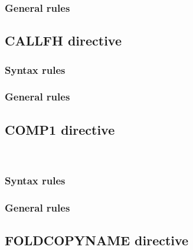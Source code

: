 \subsubsection{General rules}

\subsection{CALLFH directive}

\begin{syntax}[\miscextcolour]
  \begin{0-1}
    \literal
  \end{0-1}
\end{syntax}

\subsubsection{Syntax rules}

\subsubsection{General rules}

\subsection{COMP1 directive}

\begin{syntax}[\miscextcolour]
  \begin{1=}
     \\
  \end{1=}
\end{syntax}

\subsubsection{Syntax rules}

\subsubsection{General rules}

\subsection{FOLDCOPYNAME directive}

\begin{syntax}[\miscextcolour]
  \begin{1=}
     \\
  \end{1=}
  \literal \\
\end{syntax}

